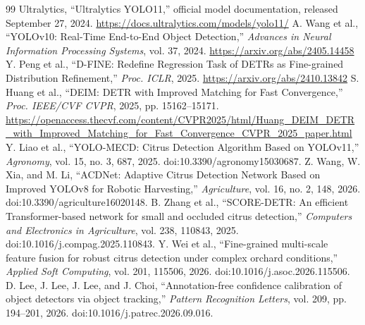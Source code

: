 \documentclass[11pt,a4paper]{ctexart}
\begin{document}
\begin{thebibliography}{99}
 Ultralytics, “Ultralytics YOLO11,” official model documentation, released September 27, 2024. \url{https://docs.ultralytics.com/models/yolo11/}
 A. Wang et al., “YOLOv10: Real-Time End-to-End Object Detection,” \emph{Advances in Neural Information Processing Systems}, vol. 37, 2024. \url{https://arxiv.org/abs/2405.14458}
 Y. Peng et al., “D-FINE: Redefine Regression Task of DETRs as Fine-grained Distribution Refinement,” \emph{Proc. ICLR}, 2025. \url{https://arxiv.org/abs/2410.13842}
 S. Huang et al., “DEIM: DETR with Improved Matching for Fast Convergence,” \emph{Proc. IEEE/CVF CVPR}, 2025, pp. 15162--15171. \url{https://openaccess.thecvf.com/content/CVPR2025/html/Huang_DEIM_DETR_with_Improved_Matching_for_Fast_Convergence_CVPR_2025_paper.html}
 Y. Liao et al., “YOLO-MECD: Citrus Detection Algorithm Based on YOLOv11,” \emph{Agronomy}, vol. 15, no. 3, 687, 2025. doi:10.3390/agronomy15030687.
 Z. Wang, W. Xia, and M. Li, “ACDNet: Adaptive Citrus Detection Network Based on Improved YOLOv8 for Robotic Harvesting,” \emph{Agriculture}, vol. 16, no. 2, 148, 2026. doi:10.3390/agriculture16020148.
 B. Zhang et al., “SCORE-DETR: An efficient Transformer-based network for small and occluded citrus detection,” \emph{Computers and Electronics in Agriculture}, vol. 238, 110843, 2025. doi:10.1016/j.compag.2025.110843.
 Y. Wei et al., “Fine-grained multi-scale feature fusion for robust citrus detection under complex orchard conditions,” \emph{Applied Soft Computing}, vol. 201, 115506, 2026. doi:10.1016/j.asoc.2026.115506.
 D. Lee, J. Lee, J. Lee, and J. Choi, “Annotation-free confidence calibration of object detectors via object tracking,” \emph{Pattern Recognition Letters}, vol. 209, pp. 194--201, 2026. doi:10.1016/j.patrec.2026.09.016.
\end{thebibliography}
\end{document}

